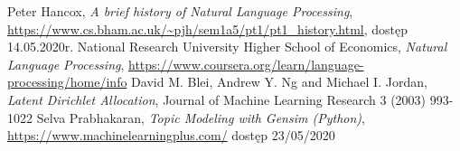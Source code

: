 \documentclass[a4paper,11pt,twoside]{report}
\theoremstyle{definition}
\begin{document}

\begin{thebibliography}{25}%
 Peter Hancox, \textit{A brief history of Natural Language Processing}, \url{https://www.cs.bham.ac.uk/~pjh/sem1a5/pt1/pt1_history.html}, dostęp 14.05.2020r.
 National Research University Higher School of Economics, \textit{Natural Language Processing}, \url{https://www.coursera.org/learn/language-processing/home/info}
 David M. Blei, Andrew Y. Ng and Michael I. Jordan, \textit{Latent Dirichlet Allocation}, Journal of Machine Learning Research 3 (2003) 993-1022
 Selva Prabhakaran, \textit{Topic Modeling with Gensim (Python)}, \url{https://www.machinelearningplus.com/} dostęp 23/05/2020

\end{thebibliography}

\thispagestyle{empty}


\listoffigures
\thispagestyle{empty}


\renewcommand{\listtablename}{Spis tabel}
\listoftables
\thispagestyle{empty}




\thispagestyle{empty}
\end{document}
